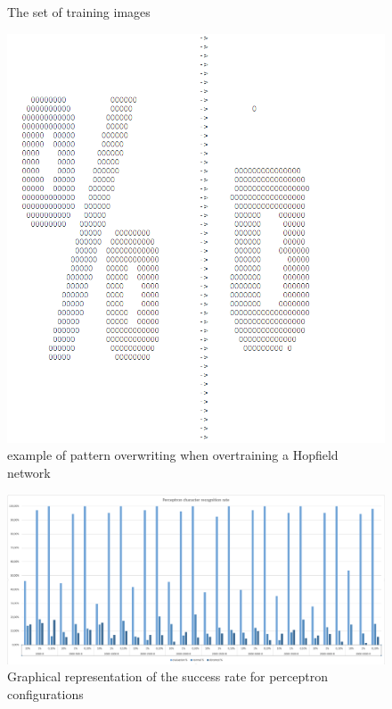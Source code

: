 \documentclass[pdftex,a4paper,12pt,twoside]{report}
\theoremstyle{plain} \newtheorem{theorem}{Theorem} \newtheorem{proposition}{Proposition} \newtheorem{lemma}{Lemma} \newtheorem*{corollary}{Corollary}
\theoremstyle{definition} \newtheorem{definition}{Definition} \newtheorem{conjecture}{Conjecture} \newtheorem*{example}{Example} \newtheorem{algorithm}{Algorithm}
\theoremstyle{remark} \newtheorem*{remark}{Remark} \newtheorem*{note}{Note} \newtheorem{case}{Case}
\begin{document}
\begin{figure}
\begin{subfigure}[b]{40px}
	\end{subfigure}
\caption{The set of training images}
\label{fig:trainingImages}
\end{figure}
\begin{figure}
\centering
\includegraphics[width=\textwidth]{./img/HopfieldFail.png}
\caption{example of pattern overwriting when overtraining a Hopfield network}
\label{fig:hopfieldfail}
\end{figure}
\begin{figure}
\centering
\includegraphics[angle=90,scale=0.45]{./img/perceptron_character_recognition_rate.png}
\caption{Graphical representation of the success rate for perceptron configurations}
\label{fig:PCRR}
\end{figure}
\end{document}
